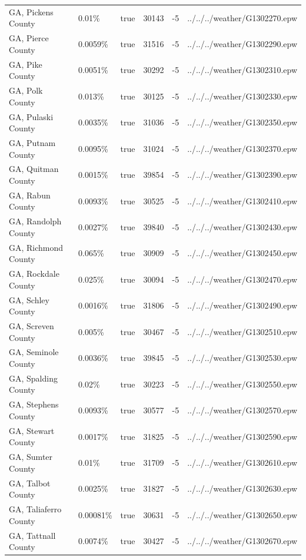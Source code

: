 \begin{longtable}[]{@{}llllll@{}}
GA, Pickens County & 0.01\% & true & 30143 & -5 &
../../../weather/G1302270.epw \\
GA, Pierce County & 0.0059\% & true & 31516 & -5 &
../../../weather/G1302290.epw \\
GA, Pike County & 0.0051\% & true & 30292 & -5 &
../../../weather/G1302310.epw \\
GA, Polk County & 0.013\% & true & 30125 & -5 &
../../../weather/G1302330.epw \\
GA, Pulaski County & 0.0035\% & true & 31036 & -5 &
../../../weather/G1302350.epw \\
GA, Putnam County & 0.0095\% & true & 31024 & -5 &
../../../weather/G1302370.epw \\
GA, Quitman County & 0.0015\% & true & 39854 & -5 &
../../../weather/G1302390.epw \\
GA, Rabun County & 0.0093\% & true & 30525 & -5 &
../../../weather/G1302410.epw \\
GA, Randolph County & 0.0027\% & true & 39840 & -5 &
../../../weather/G1302430.epw \\
GA, Richmond County & 0.065\% & true & 30909 & -5 &
../../../weather/G1302450.epw \\
GA, Rockdale County & 0.025\% & true & 30094 & -5 &
../../../weather/G1302470.epw \\
GA, Schley County & 0.0016\% & true & 31806 & -5 &
../../../weather/G1302490.epw \\
GA, Screven County & 0.005\% & true & 30467 & -5 &
../../../weather/G1302510.epw \\
GA, Seminole County & 0.0036\% & true & 39845 & -5 &
../../../weather/G1302530.epw \\
GA, Spalding County & 0.02\% & true & 30223 & -5 &
../../../weather/G1302550.epw \\
GA, Stephens County & 0.0093\% & true & 30577 & -5 &
../../../weather/G1302570.epw \\
GA, Stewart County & 0.0017\% & true & 31825 & -5 &
../../../weather/G1302590.epw \\
GA, Sumter County & 0.01\% & true & 31709 & -5 &
../../../weather/G1302610.epw \\
GA, Talbot County & 0.0025\% & true & 31827 & -5 &
../../../weather/G1302630.epw \\
GA, Taliaferro County & 0.00081\% & true & 30631 & -5 &
../../../weather/G1302650.epw \\
GA, Tattnall County & 0.0074\% & true & 30427 & -5 &
../../../weather/G1302670.epw \\

\end{longtable}
